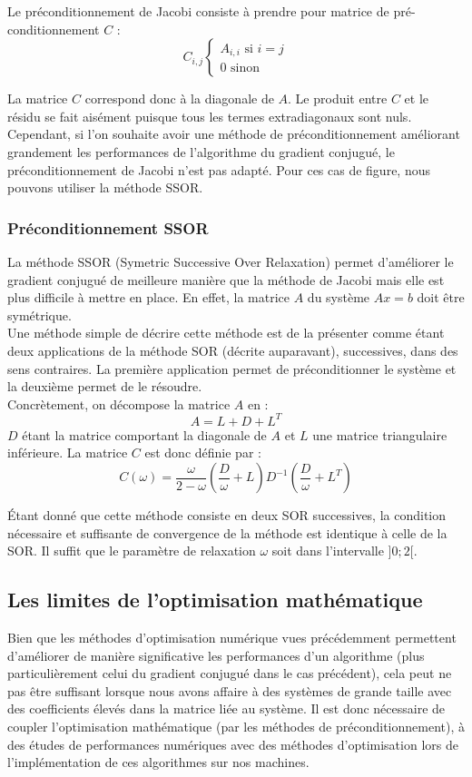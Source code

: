 Le préconditionnement de Jacobi consiste à prendre pour matrice de pré-\\conditionnement $C$ :
$$
C_{i,j}
\begin{cases}
A_{i,i}\text{ si } i=j\\
0 \text{ sinon}
\end{cases}
$$

La matrice $C$ correspond donc à la diagonale de $A$. Le produit entre $C$ et le résidu se fait aisément puisque tous les termes extradiagonaux sont nuls. Cependant, si l'on souhaite avoir une méthode de préconditionnement améliorant grandement les performances de l'algorithme du gradient conjugué, le préconditionnement de Jacobi n'est pas adapté. Pour ces cas de figure, nous pouvons utiliser la méthode SSOR.
\subsubsection{Préconditionnement SSOR}
La méthode SSOR (Symetric Successive Over Relaxation) permet d'améliorer le gradient conjugué de meilleure manière que la méthode de Jacobi mais elle est plus difficile à mettre en place. En effet, la matrice $A$ du système $Ax=b$ doit être symétrique.\\

Une méthode simple de décrire cette méthode est de la présenter comme étant deux applications de la méthode SOR (décrite auparavant), successives, dans des sens contraires. La première application permet de préconditionner le système et la deuxième permet de le résoudre.\\

Concrètement, on décompose la matrice $A$ en :
$$
A=L+D+L^T
$$
$D$ étant la matrice comportant la diagonale de $A$ et $L$ une matrice triangulaire inférieure. La matrice $C$ est donc définie par :
$$
C(\omega)=\frac{\omega}{2-\omega}(\frac{D}{\omega}+L)D^{-1}(\frac{D}{\omega}+L^T)
$$

Étant donné que cette méthode consiste en deux SOR successives, la condition nécessaire et suffisante de convergence de la méthode est identique à celle de la SOR. Il suffit que le paramètre de relaxation $\omega$ soit dans l'intervalle $]0;2[$.\\

\subsection{Les limites de l'optimisation mathématique}

Bien que les méthodes d'optimisation numérique vues précédemment permettent d'améliorer de manière significative les performances d'un algorithme (plus particulièrement celui du gradient conjugué dans le cas précédent), cela peut ne pas être suffisant lorsque nous avons affaire à des systèmes de grande taille avec des coefficients élevés dans la matrice liée au système. Il est donc nécessaire de coupler l'optimisation mathématique (par les méthodes de préconditionnement), à des études de performances numériques avec des méthodes d'optimisation lors de l'implémentation de ces algorithmes sur nos machines.

